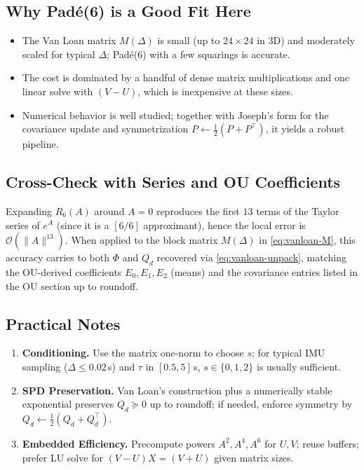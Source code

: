 \documentclass[11pt]{article}
\begin{document}
\subsection{Why Pad\'e(6) is a Good Fit Here}
\begin{itemize}
\item The Van Loan matrix $M(\Delta)$ is small (up to $24\times 24$ in 3D) and moderately scaled for typical $\Delta$; Pad\'e(6) with a few squarings is accurate.
\item The cost is dominated by a handful of dense matrix multiplications and one linear solve with $(V-U)$, which is inexpensive at these sizes.
\item Numerical behavior is well studied; together with Joseph’s form for the covariance update and symmetrization $P\leftarrow \tfrac12(P+P^\top)$, it yields a robust pipeline.
\end{itemize}

\subsection{Cross-Check with Series and OU Coefficients}
Expanding $R_6(A)$ around $A=0$ reproduces the first $13$ terms of the Taylor series of $e^A$ (since it is a $[6/6]$ approximant),
hence the local error is $\mathcal{O}(\|A\|^{13})$. When applied to the block matrix $M(\Delta)$ in \eqref{eq:vanloan-M}, this accuracy carries to both
$\Phi$ and $Q_d$ recovered via \eqref{eq:vanloan-unpack}, matching the OU-derived coefficients $E_0,E_1,E_2$ (means) and the covariance entries
listed in the OU section up to roundoff.

\subsection{Practical Notes}
\begin{enumerate}
\item \textbf{Conditioning.} Use the matrix one-norm to choose $s$; for typical IMU sampling ($\Delta\le 0.02$\,s) and $\tau$ in $[0.5,5]$\,s,
$s\in\{0,1,2\}$ is usually sufficient.
\item \textbf{SPD Preservation.} Van Loan’s construction plus a numerically stable exponential preserves $Q_d\succeq 0$ up to roundoff; if needed, enforce symmetry by $Q_d\leftarrow \tfrac12(Q_d+Q_d^\top)$.
\item \textbf{Embedded Efficiency.} Precompute powers $A^2,A^4,A^6$ for $U,V$; reuse buffers; prefer LU solve for $(V-U)X=(V+U)$ given matrix sizes.
\end{enumerate}
\end{document}
